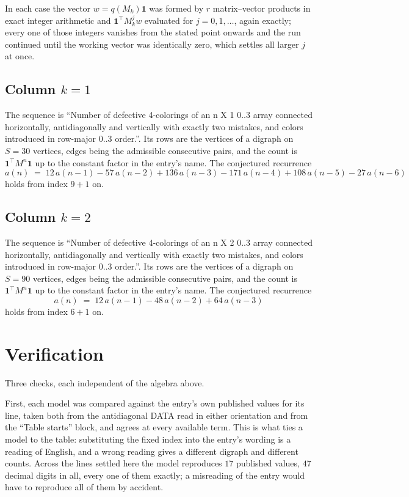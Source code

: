 \documentclass[11pt,a4paper]{article}
\theoremstyle{plain}
\theoremstyle{definition}
\begin{document}
In each case the vector $w=q(M_k)\mathbf{1}$ was formed by $r$ matrix--vector products in
exact integer arithmetic and $\mathbf{1}^{\!\top}M_k^{j}w$ evaluated for $j=0,1,\dots$,
again exactly; every one of those integers vanishes from the stated point onwards and the run
continued until the working vector was identically zero, which settles all larger $j$ at once.

\subsection*{Column $k$$=1$}
The sequence is ``Number of defective 4-colorings of an n X 1 0..3 array connected horizontally, antidiagonally and vertically with exactly two mistakes, and colors introduced in row-major 0..3 order.''. Its rows are the vertices of a digraph on
$S=30$ vertices, edges being the admissible consecutive pairs, and the count is
$\mathbf{1}^{\!\top}M^{n}\mathbf{1}$ up to the constant factor in the entry's name.
The conjectured recurrence
\[
a(n)\;=\;12\,a(n-1) - 57\,a(n-2) + 136\,a(n-3) - 171\,a(n-4) + 108\,a(n-5) - 27\,a(n-6)
\]
holds from index $9+1$ on.

\subsection*{Column $k$$=2$}
The sequence is ``Number of defective 4-colorings of an n X 2 0..3 array connected horizontally, antidiagonally and vertically with exactly two mistakes, and colors introduced in row-major 0..3 order.''. Its rows are the vertices of a digraph on
$S=90$ vertices, edges being the admissible consecutive pairs, and the count is
$\mathbf{1}^{\!\top}M^{n}\mathbf{1}$ up to the constant factor in the entry's name.
The conjectured recurrence
\[
a(n)\;=\;12\,a(n-1) - 48\,a(n-2) + 64\,a(n-3)
\]
holds from index $6+1$ on.

\section{Verification}

Three checks, each independent of the algebra above.

First, each model was compared against the entry's own published values for its line, taken
both from the antidiagonal DATA read in either orientation and from the ``Table starts''
block, and agrees at every available term. This is what ties a model to the table:
substituting the fixed index into the entry's wording is a reading of English, and a wrong
reading gives a different digraph and different counts. Across the lines settled here the
model reproduces $17$ published values, $47$ decimal digits in all, every one of
them exactly; a misreading of the entry would have to reproduce all of them by accident.
\end{document}
